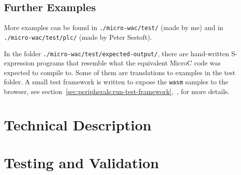 \documentclass[a4paper]{article}
\begin{document}
\subsection{Further Examples}
More examples can be found in \texttt{./micro-wac/test/} (made by me) and in \texttt{./micro-wac/test/plc/} (made by Peter Sestoft).

In the folder \texttt{./micro-wac/test/expected-output/}, there are hand-written S-expression programs that resemble what the equivalent MicroC code was expected to compile to. Some of them are translations to examples in the test folder. A small test framework is written to expose the \texttt{wasm} samples to the browser, see section~\ref{sec:peripherals:run-test-framework},~, for more details.

\section{Technical Description}
\label{sec:technical}


\section{Testing and Validation}
\label{sec:testing}
\end{document}
